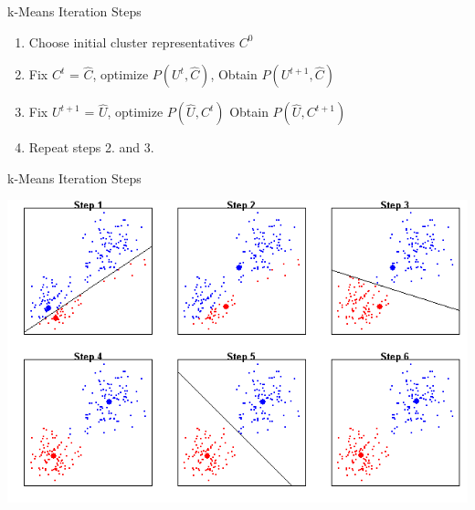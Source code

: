 \documentclass[aspectratio=1610]{beamer}
\begin{document}
\begin{frame}[standout]{k-Means Iteration Steps}
\small{
\begin{enumerate}
  \item Choose initial cluster representatives $C^0$
  \item Fix $C^t$ = $\hat{C}$, optimize $P(U^{t}, \hat{ C })$, Obtain $P(U^{t + 1}, \hat{ C })$
  \item Fix $U^{t + 1}$ = $\hat{U}$, optimize $P(\hat{U}, C^t)$ Obtain $P(\hat{ U }, C^{t + 1})$
  \item Repeat steps 2. and 3.
\end{enumerate}
}
\end{frame}

\begin{frame}{k-Means Iteration Steps}
\begin{adjustbox}{width=\textwidth, totalheight=\baselineskip,keepaspectratio}
  \includegraphics{img/kmall.png}
\end{adjustbox}
\end{frame}
\end{document}
